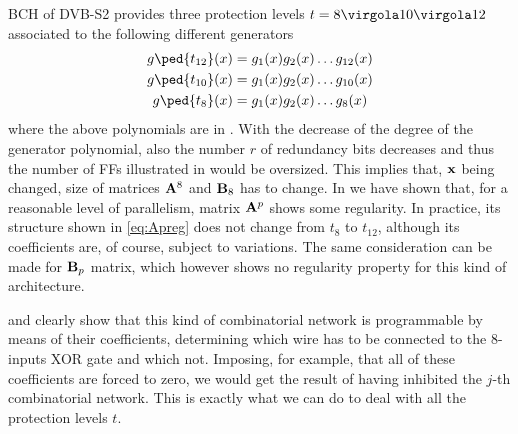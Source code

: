 BCH of DVB-S2 provides three protection levels \(t = 8\virgola 10 \virgola 12\) associated to the following different generators
\begin{align}
g\ped{t_{12}}(x) & = g_1(x)g_2(x)\ldots g_{12}(x) \label{eq:BCHt12}\\
g\ped{t_{10}}(x) & = g_1(x)g_2(x)\ldots g_{10}(x) \label{eq:BCHt10}\\
g\ped{t_8}(x) & = g_1(x)g_2(x)\ldots g_{8}(x) \label{eq:BCHt8}
\end{align}
where the above polynomials are in .
With the decrease of the degree of the generator polynomial, also the number \(r\) of redundancy bits decreases and thus the number of FFs illustrated in  would be oversized. This implies that, \(\mathbf{x}\) being changed, size of matrices \(\mathbf{A}^8\) and \(\mathbf{B}_8\) has to change. In  we have shown that, for a reasonable level of parallelism, matrix \(\mathbf{A}^p\) shows some regularity. In practice, its structure shown in \eqref{eq:Apreg} does not change from \(t_8\) to \(t_{12}\), although its coefficients are, of course, subject to variations. The same consideration can be made for \(\mathbf{B}_p\) matrix, which however shows no regularity property for this kind of architecture.

 and  clearly show that this kind of combinatorial network is programmable by means of their coefficients, determining which wire has to be connected to the 8-inputs XOR gate and which not. Imposing, for example, that all of these coefficients are forced to zero, we would get the result of having inhibited the \(j\)-th combinatorial network. This is exactly what we can do to deal with all the protection levels \(t\).

